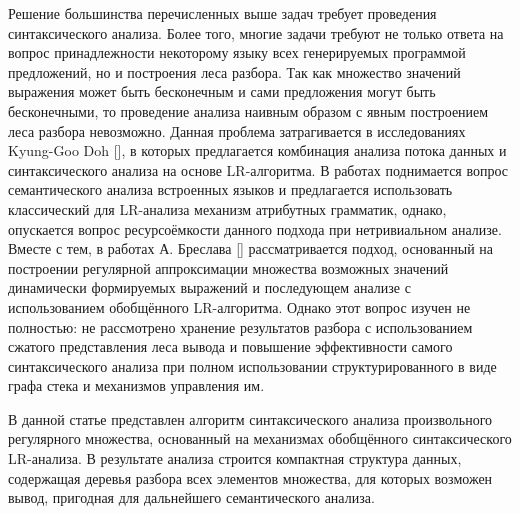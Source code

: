 Решение большинства перечисленных выше задач требует проведения синтаксического анализа. Более того, многие задачи требуют не только ответа на вопрос принадлежности некоторому языку всех генерируемых программой предложений, но и построения леса разбора. Так как множество значений выражения может быть бесконечным и сами предложения могут быть бесконечными, то проведение анализа наивным образом с явным построением леса разбора невозможно. Данная проблема затрагивается в исследованиях Kyung-Goo Doh [], в которых предлагается комбинация анализа потока данных и синтаксического анализа на основе LR-алгоритма. В работах поднимается вопрос семантического анализа встроенных языков и предлагается использовать классический для LR-анализа механизм атрибутных грамматик, однако, опускается вопрос ресурсоёмкости данного подхода при нетривиальном анализе. Вместе с тем, в работах А. Бреслава [] рассматривается подход, основанный на построении регулярной аппроксимации множества возможных значений динамически формируемых выражений и последующем анализе с использованием обобщённого LR-алгоритма. Однако этот вопрос изучен не полностью: не рассмотрено хранение результатов разбора с использованием сжатого представления леса вывода и повышение эффективности самого синтаксического анализа при полном использовании структурированного в виде графа стека и механизмов управления им.

В данной статье представлен алгоритм синтаксического анализа произвольного регулярного множества, основанный на механизмах обобщённого синтаксического LR-анализа. В результате анализа строится компактная структура данных, содержащая деревья разбора всех элементов множества, для которых возможен вывод, пригодная для дальнейшего семантического анализа.
